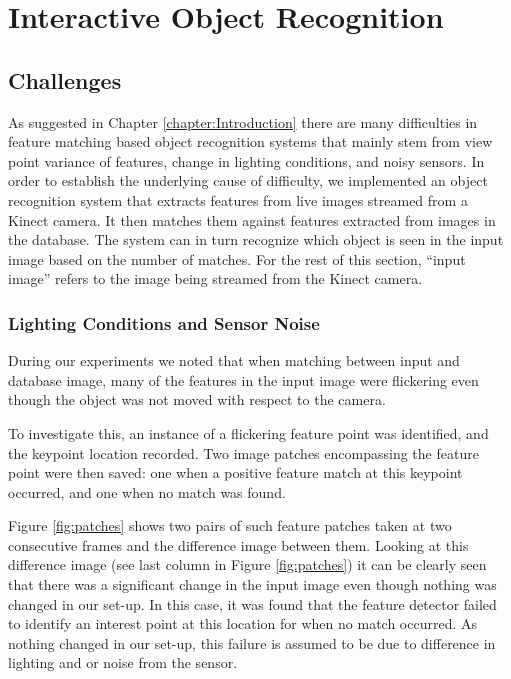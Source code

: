 \chapter{Interactive Object Recognition}
\label{chapter:Object Recognition}

\section{Challenges}
As suggested in Chapter \ref{chapter:Introduction} there are many difficulties in feature matching based object recognition systems that mainly stem from view point variance of features, change in lighting conditions, and noisy sensors. In order to establish the underlying cause of difficulty, we implemented an object recognition system that extracts features from live images streamed from a Kinect camera.  It then matches them against features extracted from images in the database. The system can in turn recognize which object is seen in the input image based on the number of matches.  For the rest of this section, ``input image'' refers to the image being streamed from the Kinect camera.

\subsection{Lighting Conditions and Sensor Noise}

During our experiments we noted that when matching between input and database image, many of the features in the input image were flickering even though the object was not moved with respect to the camera. 

To investigate this, an instance of a flickering feature point was identified, and the keypoint location recorded.  Two image patches encompassing the feature point were then saved: one when a positive feature match at this keypoint occurred, and one when no match was found. %

Figure \ref{fig:patches} shows two pairs of such feature patches taken at two consecutive frames and the difference image between them. Looking at this difference image (see last column in Figure \ref{fig:patches}) it can be clearly seen that there was a significant change in the input image even though nothing was changed in our set-up. In this case, it was found that the feature detector failed to identify an interest point at this location for when no match occurred.  As nothing changed in our set-up, this failure is assumed to be due to difference in lighting and or noise from the sensor.

